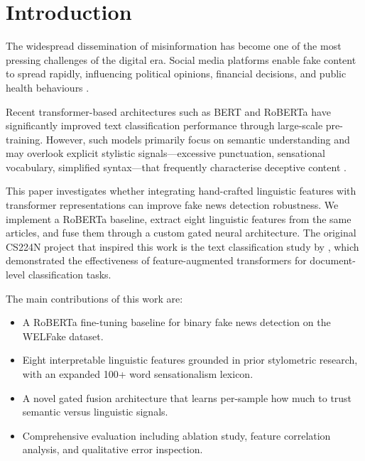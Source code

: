 \documentclass[10pt,twoside]{article}
\begin{document}
\section{Introduction}

The widespread dissemination of misinformation has become one
of the most pressing challenges of the digital era.
Social media platforms enable fake content to spread rapidly,
influencing political opinions, financial decisions, and public
health behaviours \citep{shu2017fake}.

Recent transformer-based architectures such as BERT
\citep{devlin2019bert} and RoBERTa \citep{liu2019roberta} have
significantly improved text classification performance through
large-scale pre-training.
However, such models primarily focus on semantic understanding
and may overlook explicit stylistic signals---excessive
punctuation, sensational vocabulary, simplified syntax---that
frequently characterise deceptive content
\citep{perez2018automatic}.

This paper investigates whether integrating hand-crafted
linguistic features with transformer representations can
improve fake news detection robustness.
We implement a RoBERTa baseline, extract eight linguistic
features from the same articles, and fuse them through a
custom gated neural architecture.
The original CS224N project that inspired this work is the
text classification study by \citet{cs224n_ref}, which
demonstrated the effectiveness of feature-augmented
transformers for document-level classification tasks.

The main contributions of this work are:
\begin{itemize}[leftmargin=*,itemsep=1pt,topsep=2pt]
  \item A RoBERTa fine-tuning baseline for binary fake news
        detection on the WELFake dataset.
  \item Eight interpretable linguistic features grounded in
        prior stylometric research, with an expanded 100+
        word sensationalism lexicon.
  \item A novel gated fusion architecture that learns
        per-sample how much to trust semantic versus
        linguistic signals.
  \item Comprehensive evaluation including ablation study,
        feature correlation analysis, and qualitative error
        inspection.
\end{itemize}

\end{document}
